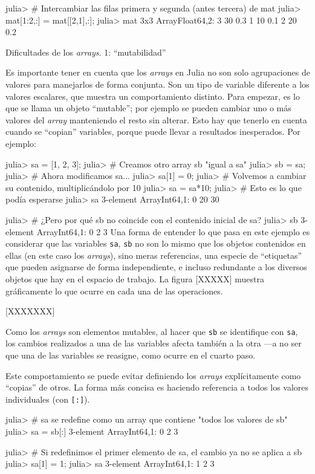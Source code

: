 ﻿\documentclass{article}
\newcommand{\jl}{\texttt}
\begin{document}
julia> # Intercambiar las filas primera y segunda (antes tercera) de mat
julia> mat[1:2,:] = mat[[2,1],:];
julia> mat
3x3 Array{Float64,2}:
 3 30 0.3
 1 10 0.1
 2 20 0.2

Dificultades de los \emph{arrays}. 1: ``mutabilidad''

Es importante tener en cuenta que los \emph{arrays} en Julia no son solo agrupaciones de valores para manejarlos de forma conjunta. Son un tipo de variable diferente a los valores escalares, que muestra un comportamiento distinto. Para empezar, es lo que se llama un objeto ``mutable''; por ejemplo se pueden cambiar uno o más valores del \emph{array} manteniendo el resto sin alterar. Esto hay que tenerlo en cuenta cuando se ``copian'' variables, porque puede llevar a resultados inesperados. Por ejemplo:

julia> sa = [1, 2, 3];
julia> # Creamos otro array sb "igual a sa"
julia> sb = sa;
julia> # Ahora modificamos sa...
julia> sa[1] = 0;
julia> # Volvemos a cambiar su contenido, multiplicándolo por 10
julia> sa = sa*10;
julia> # Esto es lo que podía esperarse
julia> sa
3-element Array{Int64,1}:
  0
 20
 30

julia> # ¿Pero por qué sb no coincide con el contenido inicial de sa?
julia> sb
3-element Array{Int64,1}:
 0
 2
 3
Una forma de entender lo que pasa en este ejemplo es considerar que las variables \jl{sa}, \jl{sb} no son lo mismo que los objetos contenidos en ellas (en este caso los \emph{arrays}), sino meras referencias, una especie de ``etiquetas'' que pueden asignarse de forma independiente, e incluso redundante a los diversos objetos que hay en el espacio de trabajo. La figura [XXXXX] muestra gráficamente lo que ocurre en cada una de las operaciones.

[XXXXXXX]

Como los \emph{arrays} son elementos mutables, al hacer que \jl{sb} se identifique con \jl{sa}, los cambios realizados a una de las variables afecta también a la otra ---a no ser que una de las variables se reasigne, como ocurre en el cuarto paso.

Este comportamiento se puede evitar definiendo los \emph{arrays} explícitamente como ``copias'' de otros. La forma más concisa es haciendo referencia a todos los valores individuales (con \jl{[:]}).

julia> # sa se redefine como un array que contiene "todos los valores de sb"
julia> sa = sb[:]
3-element Array{Int64,1}:
 0
 2
 3

julia> # Si redefinimos el primer elemento de sa, el cambio ya no se aplica a sb
julia> sa[1] = 1;
julia> sa
3-element Array{Int64,1}:
 1
 2
 3
\end{document}
